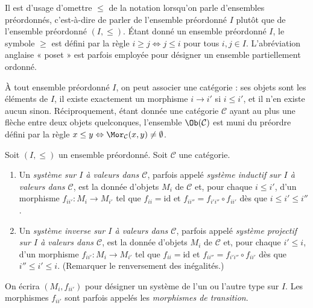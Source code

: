 \noindent
Il est d'usage d'omettre $\leq$ de la notation lorsqu'on parle d'ensembles
préordonnés, c'est-à-dire de parler de l'ensemble préordonné $I$ plutôt que
de l'ensemble préordonné $(I, \leq)$. Étant donné un ensemble préordonné
$I$, le symbole $\geq$ est défini par la règle
$i \geq j \Leftrightarrow j \leq i$ pour tous $i, j \in I$.
L'abréviation anglaise « poset » est parfois employée pour désigner un
ensemble partiellement ordonné.

\medskip\noindent
À tout ensemble préordonné $I$, on peut associer une catégorie : ses objets
sont les éléments de $I$, il existe exactement un morphisme $i \to i'$ si
$i \leq i'$, et il n'en existe aucun sinon. Réciproquement, étant donnée une
catégorie $\mathcal{C}$ ayant au plus une flèche entre deux objets quelconques,
l'ensemble $\Ob(\mathcal{C})$ est muni du préordre défini par la règle
$x \leq y \Leftrightarrow \Mor_\mathcal{C}(x, y) \not = \emptyset$.

\begin{definition}
\label{definition-system-over-poset}
Soit $(I, \leq)$ un ensemble préordonné. Soit $\mathcal{C}$ une catégorie.
\begin{enumerate}
\item Un {\it système sur $I$ à valeurs dans $\mathcal{C}$}, parfois appelé
{\it système inductif sur $I$ à valeurs dans $\mathcal{C}$}, est la donnée d'objets
$M_i$ de $\mathcal{C}$ et, pour chaque $i \leq i'$, d'un morphisme
$f_{ii'} : M_i \to M_{i'}$ tel que $f_{ii} = \text{id}$ et
$f_{ii''} = f_{i'i''} \circ f_{i i'}$ dès que $i \leq i' \leq i''$.
\item Un {\it système inverse sur $I$ à valeurs dans $\mathcal{C}$}, parfois appelé
{\it système projectif sur $I$ à valeurs dans $\mathcal{C}$}, est la donnée d'objets
$M_i$ de $\mathcal{C}$ et, pour chaque $i' \leq i$, d'un morphisme
$f_{ii'} : M_i \to M_{i'}$ tel que $f_{ii} = \text{id}$ et
$f_{ii''} = f_{i'i''} \circ f_{i i'}$ dès que $i'' \leq i' \leq i$.
(Remarquer le renversement des inégalités.)
\end{enumerate}
On écrira $(M_i, f_{ii'})$ pour désigner un système de l'un ou l'autre type sur $I$.
Les morphismes $f_{ii'}$ sont parfois appelés les
{\it morphismes de transition}.
\end{definition}

